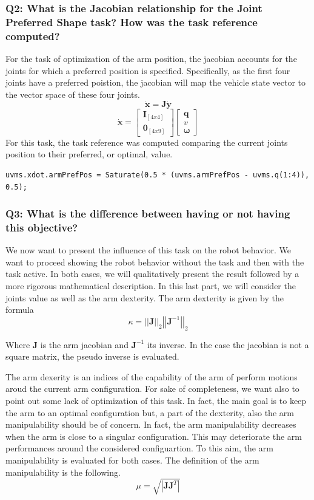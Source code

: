 \documentclass{article}
\begin{document}
\subsubsection{Q2: What is the Jacobian relationship for the Joint Preferred Shape task? How was the task reference computed?}
For the task of optimization of the arm position, the jacobian accounts for the joints for which a preferred position is specified. Specifically, as the first four joints have a preferred poistion, the jacobian will map the vehicle state vector to the vector space of these four joints. 
$$
	\bm{\dot{x}} = \bm{J}\bm{\dot{y}}
$$ $$	
	\bm{\dot{x}} = \begin{bmatrix} \bm{I}_{[4x4]} \\ \bm{0}_{[4x9]} \end{bmatrix}         
	\begin{bmatrix} \bm{q}    \\ \bm{\textit{v}} \\ \bm{\omega} \end{bmatrix} 	   
$$
For this task, the task reference was computed comparing the current joints position to their preferred, or optimal, value. 
\begin{lstlisting}
uvms.xdot.armPrefPos = Saturate(0.5 * (uvms.armPrefPos - uvms.q(1:4)), 0.5);
\end{lstlisting}

\subsubsection{Q3: What is the difference between having or not having this objective?}

We now want to present the influence of this task on the robot behavior. We want to proceed showing the robot behavior without the task and then with the task active. In both cases, we will qualitatively present the result followed by a more rigorous mathematical description. In this last part, we will consider the joints value as well as the arm dexterity. The arm dexterity is given by the formula
$$ \kappa = \left|\left| \bm{J} \right|\right|_2 \left|\left| \bm{J}^{-1} \right|\right|_2
$$

Where $\bm{J}$ is the arm jacobian and $\bm{J}^{-1}$ its inverse. In the case the jacobian is not a square matrix, the pseudo inverse is evaluated. 

The arm dexerity is an indices of the capability of the arm of perform motions aroud the current arm configuration. 
For sake of completeness, we want also to point out some lack of optimization of this task. In fact, the main goal is to keep the arm to an optimal configuration but, a part of the dexterity, also the arm manipulability should be of concern. In fact, the arm manipulability decreases when the arm is close to a singular configuration. This may deteriorate the arm performances around the considered configuartion. To this aim, the arm manipulability is evaluated for both cases. The definition of the arm manipulability is the following. 
$$
	\mu = \sqrt{\left| \bm{J} \bm{J}^T \right|}
$$
\end{document}

